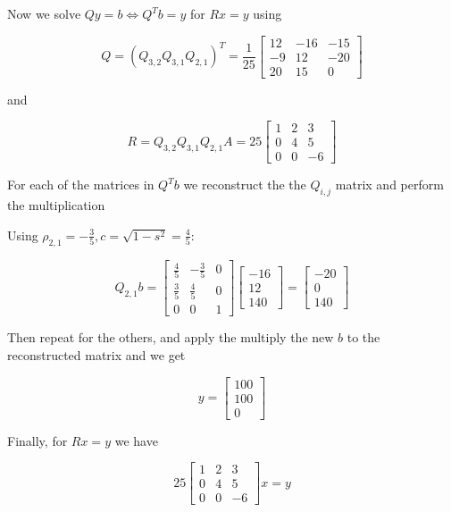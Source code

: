 Now we solve \(Qy = b \iff Q^T b = y\) for \(Rx = y\) using 

\[
    Q = (Q_{3,2}Q_{3,1}Q_{2,1})^T
    = 
    \frac{1}{25}
    \begin{bmatrix}
        12 & -16 & -15 \\ 
        -9 & 12 & -20 \\ 
        20 & 15 & 0
    \end{bmatrix}
\]

and 

\[
    R = Q_{3,2}Q_{3,1}Q_{2,1}A = 25
    \begin{bmatrix}
       1 & 2 & 3 \\ 
       0 & 4 & 5 \\ 
       0 & 0 & -6 
    \end{bmatrix}
\]

For each of the matrices in \(Q^Tb\) we reconstruct the the \(Q_{i,j}\) matrix and perform the 
multiplication 

Using \(\rho_{2,1} = -\frac{3}{5}, c = \sqrt{1 - s^2} = \frac{4}{5}\):

\[
    Q_{2,1}b = 
    \begin{bmatrix}
        \frac{4}{5} & - \frac{3}{5} & 0 \\ 
        \frac{3}{5} & \frac{4}{5} & 0 \\ 
        0 & 0 & 1
    \end{bmatrix}
    \begin{bmatrix}
        -16 \\ 
        12 \\ 
        140
    \end{bmatrix}
    = 
    \begin{bmatrix}
        -20 \\ 
        0 \\ 
        140
    \end{bmatrix}
\]

Then repeat for the others, and apply the multiply the new \(b\) to the reconstructed matrix and we get 

\[
    y = 
    \begin{bmatrix}
        100 \\ 
        100 \\ 
        0
    \end{bmatrix}
\]

Finally, for \(Rx = y\) we have 

\[
    25 
    \begin{bmatrix}
       1 & 2 & 3 \\ 
       0 & 4 & 5 \\ 
       0 & 0 & -6 
    \end{bmatrix}
    x 
    = 
    y
\]

